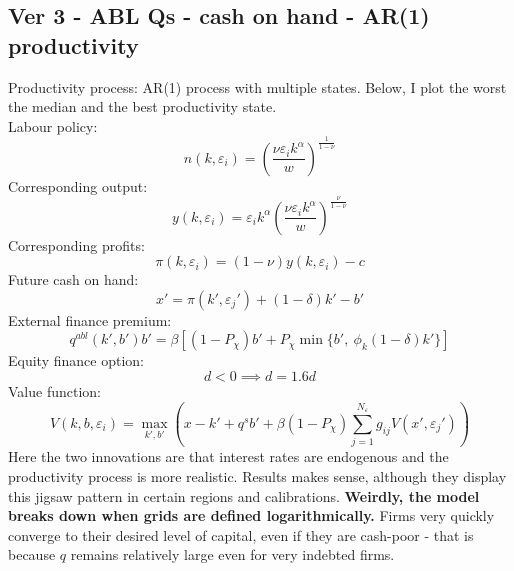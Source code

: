 \documentclass[12pt]{article}
\begin{document}
\subsection{Ver 3 - ABL Qs - cash on hand - AR(1) productivity}
Productivity process: AR(1) process with multiple states. Below, I plot the worst the median and the best productivity state. \vspace{3mm} \\
Labour policy: 
\begin{equation}
    n(k,\varepsilon_i) = \left( \dfrac{ \nu \varepsilon_i k^\alpha}{w} \right)^{\frac{1}{1-\nu}}
\end{equation}
Corresponding output: 
\begin{equation}
    y(k,\varepsilon_i) = \varepsilon_i k^{\alpha} \left( \dfrac{\nu \varepsilon_i k^\alpha}{w} \right)^{\frac{\nu}{1-\nu}}
\end{equation}
Corresponding profits: 
\begin{equation}
    \pi(k,\varepsilon_i) = (1-\nu) y(k,\varepsilon_i) - c
\end{equation}
Future cash on hand: 
\begin{equation}
   x' = \pi(k',\varepsilon_j')+(1-\delta)k'-b'
\end{equation}
External finance premium:
\begin{equation}
    q^{abl}(k',b')b' = \beta \left[ (1-P_\chi) b' + P_\chi \min\{b', \ \phi_k (1-\delta) k' \} \right]  
\end{equation}
Equity finance option:
\begin{equation}
    d < 0 \implies d = 1.6d
\end{equation}
Value function:
\begin{equation}
     V(k,b, \varepsilon_i) = \max_{k',b'}  \left( x - k' +  q^s b' +
            \beta (1-P_\chi) \sum_{j=1}^{N_\varepsilon} g_{ij}  V(x',\varepsilon_j') \right)
\end{equation}
Here the two innovations are that interest rates are endogenous and the productivity process is more realistic. Results makes sense, although they display this jigsaw pattern in certain regions and calibrations. \textbf{Weirdly, the model breaks down when grids are defined logarithmically.} Firms very quickly converge to their desired level of capital, even if they are cash-poor - that is because $q$ remains relatively large even for very indebted firms.
\end{document}
